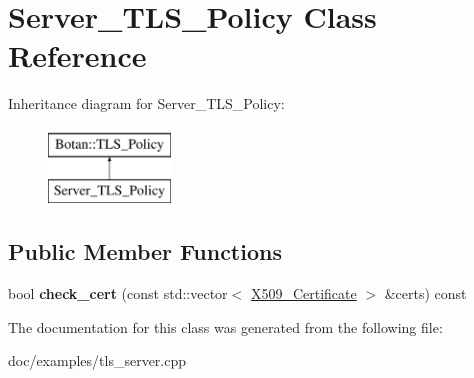 \hypertarget{classServer__TLS__Policy}{\section{Server\-\_\-\-T\-L\-S\-\_\-\-Policy Class Reference}
\label{classServer__TLS__Policy}
}
Inheritance diagram for Server\-\_\-\-T\-L\-S\-\_\-\-Policy\-:\begin{figure}[H]
\begin{center}
\leavevmode
\includegraphics[height=2.000000cm]{classServer__TLS__Policy}
\end{center}
\end{figure}
\subsection*{Public Member Functions}
\begin{DoxyCompactItemize}
\item 
\hypertarget{classServer__TLS__Policy_a2fa21ab81c1192f3be7396b36ce585e8}{bool {\bfseries check\-\_\-cert} (const std\-::vector$<$ \hyperlink{classBotan_1_1X509__Certificate}{X509\-\_\-\-Certificate} $>$ \&certs) const }\label{classServer__TLS__Policy_a2fa21ab81c1192f3be7396b36ce585e8}

\end{DoxyCompactItemize}


The documentation for this class was generated from the following file\-:\begin{DoxyCompactItemize}
\item 
doc/examples/tls\-\_\-server.\-cpp\end{DoxyCompactItemize}
